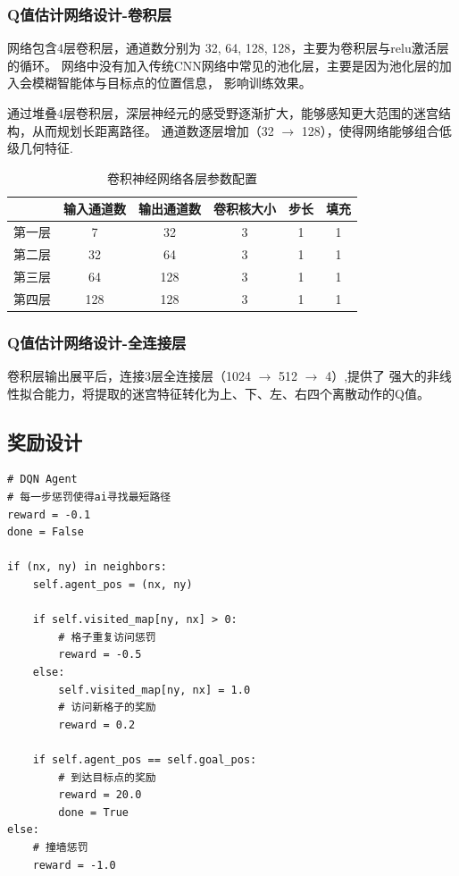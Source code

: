 \documentclass[conference]{IEEEtran}
\begin{document}
\subsubsection{Q值估计网络设计-卷积层}
网络包含4层卷积层，通道数分别为 32, 64, 128, 128，主要为卷积层与relu激活层的循环。
网络中没有加入传统CNN网络中常见的池化层，主要是因为池化层的加入会模糊智能体与目标点的位置信息，
影响训练效果。\par
通过堆叠4层卷积层，深层神经元的感受野逐渐扩大，能够感知更大范围的迷宫结构，从而规划长距离路径。
通道数逐层增加（32 $\to$ 128），使得网络能够组合低级几何特征.
\begin{table}[htbp]
\centering
\caption{卷积神经网络各层参数配置}
\begin{tabular}{|l|c|c|c|c|c|}
\hline
\textbf{} & \textbf{输入通道数} & \textbf{输出通道数} & \textbf{卷积核大小} & \textbf{步长} & \textbf{填充} \\ \hline
第一层    & 7                   & 32                  & 3                    & 1           & 1           \\ \hline
第二层    & 32                  & 64                  & 3                    & 1           & 1           \\ \hline
第三层    & 64                  & 128                 & 3                    & 1           & 1           \\ \hline
第四层    & 128                 & 128                 & 3                    & 1           & 1           \\ \hline
\end{tabular}
\end{table}

\subsubsection{Q值估计网络设计-全连接层}
卷积层输出展平后，连接3层全连接层（1024 $\to$ 512 $\to$ 4）,提供了
强大的非线性拟合能力，将提取的迷宫特征转化为上、下、左、右四个离散动作的Q值。

\subsection{奖励设计}
\begin{lstlisting}
# DQN Agent
# 每一步惩罚使得ai寻找最短路径
reward = -0.1 
done = False

if (nx, ny) in neighbors:
    self.agent_pos = (nx, ny)
    
    if self.visited_map[ny, nx] > 0:
        # 格子重复访问惩罚
        reward = -0.5 
    else:
        self.visited_map[ny, nx] = 1.0
        # 访问新格子的奖励
        reward = 0.2
    
    if self.agent_pos == self.goal_pos:
        # 到达目标点的奖励
        reward = 20.0
        done = True
else:
    # 撞墙惩罚
    reward = -1.0
\end{lstlisting}
\end{document}
